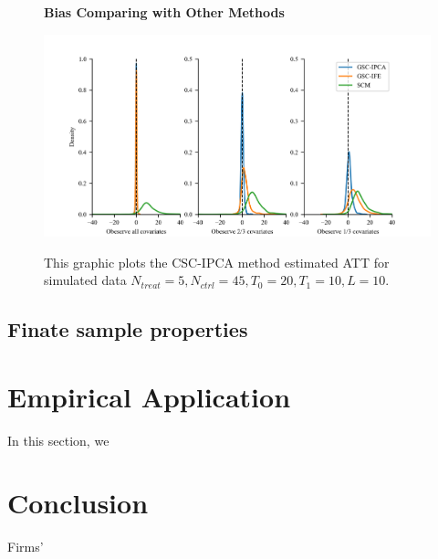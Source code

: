 \documentclass[12pt]{article}
\begin{document}
\begin{figure}[!ht]
    \centering
    \caption{\textbf{Bias Comparing with Other Methods}}
    \includegraphics{figs/bias_compar1.png}
    \label{fig: bias}
    \caption*{\footnotesize{This graphic plots the CSC-IPCA method estimated ATT for simulated data $N_{treat} = 5, N_{ctrl} = 45, T_0=20, T_1=10, L=10$.}}
    \end{figure}

\subsection{Finate sample properties}

\section{Empirical Application}
\label{sec: application}

In this section, we
\section{Conclusion} 
\label{sec: conclusion}

Firms' 

\clearpage
\begingroup
{}


\endgroup

\clearpage
\setcounter{figure}{0}
\setcounter{table}{0}
\renewcommand\thetable{\Alph{section}.\arabic{table}}
\renewcommand\thefigure{\Alph{section}.\arabic{figure}}
\end{document}
